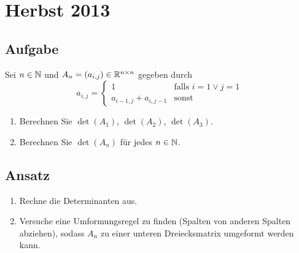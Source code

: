 \newpage

\section{Herbst 2013}

\subsection{Aufgabe}
Sei \( n \in \mathbb{N} \) und \( A_n = (a_{i,j}) \in \mathbb{R}^{n \times n} \) gegeben durch
\begin{equation*}
	a_{i,j} = \begin{cases}
		1 &\text{falls } i = 1 \vee j = 1 \\
		a_{i-1,j}+a_{i,j-1} &\text{sonst}
	\end{cases} 
\end{equation*}
\begin{enumerate}
	\item Berechnen Sie \( \det(A_1) \), \( \det(A_2) \), \( \det(A_3) \).
	\item Berechnen Sie \( \det(A_n) \) für jedes \( n \in \mathbb{N} \). 
\end{enumerate}

\subsection{Ansatz}
\begin{enumerate}
	\item Rechne die Determinanten aus.
	\item Versuche eine Umformungsregel zu finden (Spalten von anderen Spalten abziehen), sodass \( A_n \) zu einer unteren Dreiecksmatrix umgeformt werden kann. 
\end{enumerate}


